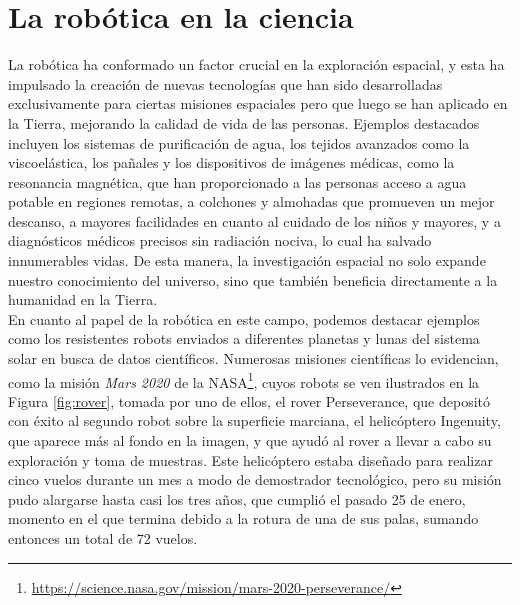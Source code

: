\section{La robótica en la ciencia}
\label{sec:exploracion_espacial} %

La robótica ha conformado un factor crucial en la exploración espacial, y esta
ha impulsado la creación de nuevas tecnologías que han sido desarrolladas
exclusivamente para ciertas misiones espaciales pero que luego se han aplicado
en la Tierra, mejorando la calidad de vida de las personas.
Ejemplos destacados incluyen los sistemas de purificación de agua, los tejidos
avanzados como la viscoelástica, los pañales y los dispositivos de imágenes
médicas, como la resonancia magnética, que han proporcionado a las personas
acceso a agua potable en regiones remotas, a colchones y almohadas que promueven
un mejor descanso, a mayores facilidades en cuanto al cuidado de los niños y
mayores, y a diagnósticos médicos precisos sin radiación nociva, lo cual ha
salvado innumerables vidas.
De esta manera, la investigación espacial no solo expande nuestro conocimiento
del universo, sino que también beneficia directamente a la humanidad en la
Tierra.
\\

En cuanto al papel de la robótica en este campo, podemos destacar ejemplos como
los resistentes robots enviados a diferentes planetas y lunas del sistema solar
en busca de datos científicos.
Numerosas misiones científicas lo evidencian, como la misión \textit{Mars 2020}
de la NASA\footnote{
\href{https://science.nasa.gov/mission/mars-2020-perseverance/}{https://science.nasa.gov/mission/mars-2020-perseverance/}},
cuyos robots se ven ilustrados en la Figura \ref{fig:rover}, tomada por uno de
ellos, el rover Perseverance, que depositó con éxito al segundo robot sobre la
superficie marciana, el helicóptero Ingenuity, que aparece más al fondo en la
imagen, y que ayudó al rover a llevar a cabo su exploración y toma de muestras.
Este helicóptero estaba diseñado para realizar cinco vuelos durante un mes a
modo de demostrador tecnológico, pero su misión pudo alargarse hasta casi los
tres años, que cumplió el pasado 25 de enero, momento en el que termina debido a
la rotura de una de sus palas, sumando entonces un total de 72 vuelos.

